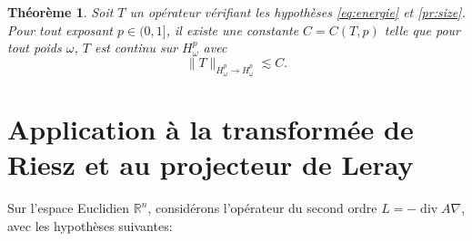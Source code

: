 \documentclass[11pt]{amsart}
\newtheorem{theorem}{Th\'eor\`eme}
\DeclareMathOperator{\dive}{div}
\newcommand{\rr}{\mathbb}
\newcommand{\comment}[1]{\vskip.3cm
\fbox{%
\parbox{0.93\linewidth}{\footnotesize #1}}
\vskip.3cm}
\begin{document}
\begin{theorem} \label{thm:hardy} Soit $T$ un op\'erateur v\'erifiant les hypoth\`eses \eqref{eq:energie} et \eqref{pr:size}. Pour tout exposant $p\in(0,1]$, il existe une constante $C=C(T,p)$ telle que pour tout poids $\omega$, $T$ est continu sur $H^p_\omega$ avec
$$ \|T\|_{H^p_\omega \to H^p_\omega} \lesssim C.$$
\end{theorem}




\section{Application \`a la transform\'ee de Riesz et au projecteur de Leray}
\label{sec:leray}

Sur l'espace Euclidien ${\rr R}^n$, consid\'erons l'op\'erateur du second ordre $L=-\dive A \nabla$, avec les hypoth\`eses suivantes:
\end{document}
